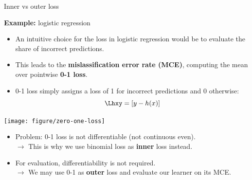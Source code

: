 \documentclass[11pt,compress,t,notes=noshow, xcolor=table]{beamer}
\begin{document}
\begin{vbframe}{Inner vs outer loss}

\small

\textbf{Example:} logistic regression

\begin{itemize}
  \item An intuitive choice for the loss in logistic regression would be to
  evaluate the share of incorrect predictions.
  \item This leads to the \textbf{mislassification error rate (MCE)}, computing
  the mean over pointwise \textbf{0-1 loss}.
\end{itemize}

\lz

\begin{minipage}{0.6\textwidth}
  \begin{itemize}
    \item 0-1 loss simply assigns a loss of 1 for incorrect predictions and 0
    otherwise: $$\Lhxy = [y - \hx]$$
  \end{itemize}
\end{minipage}%
\begin{minipage}{0.4\textwidth}
  \texttt{[image: figure/zero-one-loss]}
\end{minipage}

\lz

\begin{itemize}
  \item Problem: 0-1 loss is not differentiable (not continuous even). \\
  $\rightarrow$ This is why we use binomial loss as \textbf{inner} loss 
  instead.
  \item For evaluation, differentiability is not required. \\
  $\rightarrow$ We may use 0-1 as \textbf{outer} loss and evaluate our 
  learner on its MCE. 
\end{itemize}

\normalsize

\end{vbframe}

\end{document}
